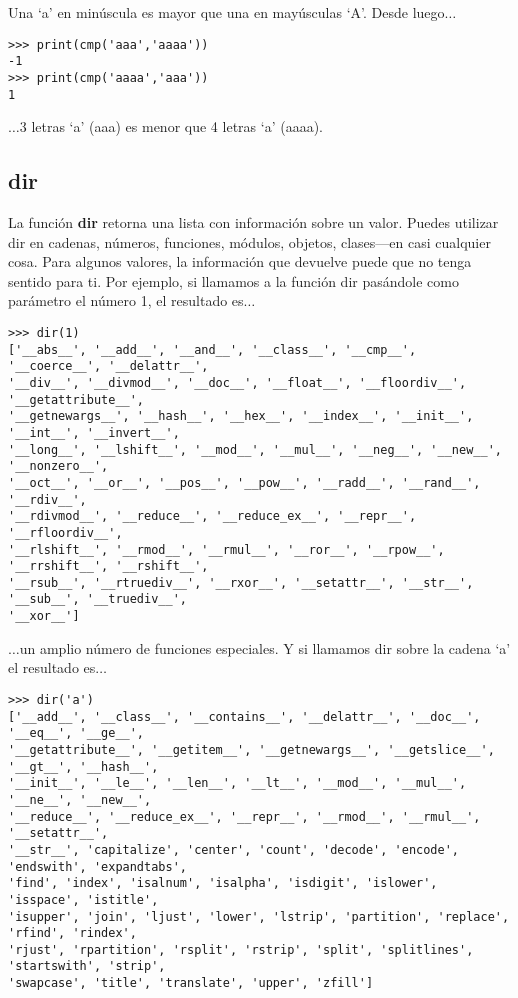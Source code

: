 Una `a' en minúscula es mayor que una en mayúsculas `A'. Desde luego$\ldots$

\begin{listing}
\begin{verbatim}
>>> print(cmp('aaa','aaaa'))
-1
>>> print(cmp('aaaa','aaa'))
1
\end{verbatim}
\end{listing}

\noindent
$\ldots$3 letras `a' (aaa) es menor que 4 letras `a' (aaaa).

\subsection*{dir}

La función \textbf{dir} retorna una lista con información sobre un valor.   Puedes utilizar dir en cadenas, números, funciones, módulos, objetos, clases---en casi cualquier cosa.   Para algunos valores, la información que devuelve puede que no tenga sentido para ti.   Por ejemplo, si llamamos a la función dir pasándole como parámetro el número 1, el resultado es$\ldots$

\begin{listingignore}
\begin{verbatim}
>>> dir(1)
['__abs__', '__add__', '__and__', '__class__', '__cmp__', '__coerce__', '__delattr__', 
'__div__', '__divmod__', '__doc__', '__float__', '__floordiv__', '__getattribute__', 
'__getnewargs__', '__hash__', '__hex__', '__index__', '__init__', '__int__', '__invert__', 
'__long__', '__lshift__', '__mod__', '__mul__', '__neg__', '__new__', '__nonzero__', 
'__oct__', '__or__', '__pos__', '__pow__', '__radd__', '__rand__', '__rdiv__', 
'__rdivmod__', '__reduce__', '__reduce_ex__', '__repr__', '__rfloordiv__', 
'__rlshift__', '__rmod__', '__rmul__', '__ror__', '__rpow__', '__rrshift__', '__rshift__',
'__rsub__', '__rtruediv__', '__rxor__', '__setattr__', '__str__', '__sub__', '__truediv__',
'__xor__']
\end{verbatim}
\end{listingignore}

$\ldots$un amplio número de funciones especiales.  Y si llamamos dir sobre la cadena `a' el resultado es$\ldots$

\begin{listingignore}
\begin{verbatim}
>>> dir('a')
['__add__', '__class__', '__contains__', '__delattr__', '__doc__', '__eq__', '__ge__', 
'__getattribute__', '__getitem__', '__getnewargs__', '__getslice__', '__gt__', '__hash__',
'__init__', '__le__', '__len__', '__lt__', '__mod__', '__mul__', '__ne__', '__new__', 
'__reduce__', '__reduce_ex__', '__repr__', '__rmod__', '__rmul__', '__setattr__', 
'__str__', 'capitalize', 'center', 'count', 'decode', 'encode', 'endswith', 'expandtabs', 
'find', 'index', 'isalnum', 'isalpha', 'isdigit', 'islower', 'isspace', 'istitle', 
'isupper', 'join', 'ljust', 'lower', 'lstrip', 'partition', 'replace', 'rfind', 'rindex', 
'rjust', 'rpartition', 'rsplit', 'rstrip', 'split', 'splitlines', 'startswith', 'strip', 
'swapcase', 'title', 'translate', 'upper', 'zfill']
\end{verbatim}
\end{listingignore}


